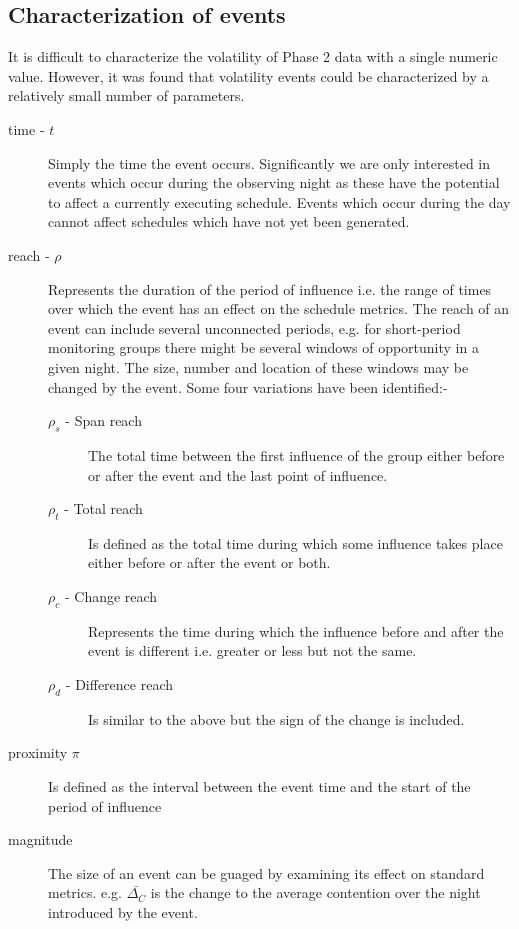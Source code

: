 \subsection{Characterization of events}
\label{sect:volchar} 
It is difficult to characterize the volatility of Phase 2 data with a single numeric value. However, it was found that volatility events could be characterized by a relatively small number of parameters.
\begin{description} 
\item [time - $t$] Simply the time the event occurs. Significantly we are only interested in events which occur during the observing night as these have the potential to affect a currently executing schedule. Events which occur during the day cannot affect schedules which have not yet been generated.
\item [reach - $\rho$] Represents the duration of the period of influence i.e. the range of times over which the event has an effect on the schedule metrics. The reach of an event can include several unconnected periods, e.g.  for short-period monitoring groups there might be several windows of opportunity in a given night. The size, number and location of these windows may be changed by the event. Some four variations have been identified:-
\begin{description}

\item [$\rho_s$ - Span reach] The total time between the first influence of the group either before or after the event and the last point of influence.
\item [$\rho_t$ - Total reach] Is defined as the total time during which some influence takes place either before or after the event or both.
\item [$\rho_c$ - Change reach] Represents the time during which the influence before and after the event is different i.e. greater or less but not the same. 
\item [$\rho_d$ - Difference reach] Is similar to the above but the sign of the change is included.
\end{description}
\item [proximity $\pi$] Is defined as the interval between the event time and the start of the period of influence
\item [magnitude] The size of an event can be guaged by examining its effect on standard metrics. e.g. $\bar{\Delta_C}$ is the change to the average contention over the night introduced by the event.
\end{description}


